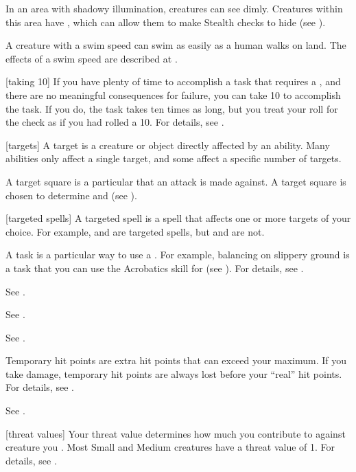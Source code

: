  In an area with shadowy illumination, creatures can see dimly.
Creatures within this area have \concealment, which can allow them to make Stealth checks to hide (see ).

 A creature with a swim speed can swim as easily as a human walks on land.
The effects of a swim speed are described at .

[taking 10] If you have plenty of time to accomplish a task that requires a , and there are no meaningful consequences for failure, you can take 10 to accomplish the task.
If you do, the task takes ten times as long, but you treat your roll for the check as if you had rolled a 10.
For details, see .

[targets] A target is a creature or object directly affected by an ability.
Many abilities only affect a single target, and some affect a specific number of targets.

 A target square is a particular  that an attack is made against.
A target square is chosen to determine  and  (see ).

[targeted spells] A targeted spell is a spell that affects one or more targets of your choice.
For example,  and  are targeted spells, but  and  are not.

 A task is a particular way to use a .
For example, balancing on slippery ground is a task that you can use the Acrobatics skill for (see ).
For details, see .

 See .

 See .

 See .

 Temporary hit points are extra hit points that can exceed your maximum.
If you take damage, temporary hit points are always lost before your ``real'' hit points.
For details, see .

 See .

[threat values] Your threat value determines how much you contribute to  against creature you .
Most Small and Medium creatures have a threat value of 1.
For details, see .

